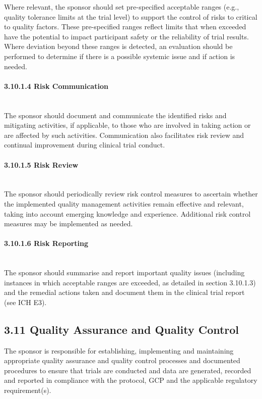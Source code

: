 \documentclass[11pt]{article}
\begin{document}
Where relevant, the sponsor should set pre-specified acceptable ranges (e.g., quality tolerance limits at the trial level) to support the control of risks to critical to quality factors. These pre-specified ranges reflect limits that when exceeded have the potential to impact participant safety or the reliability of trial results. Where deviation beyond these ranges is detected, an evaluation should be performed to determine if there is a possible systemic issue and if action is needed.


\paragraph{3.10.1.4 Risk Communication}\mbox{}\\

The sponsor should document and communicate the identified risks and mitigating activities, if applicable, to those who are involved in taking action or are affected by such activities. Communication also facilitates risk review and continual improvement during clinical trial conduct.


\paragraph{3.10.1.5 Risk Review}\mbox{}\\

The sponsor should periodically review risk control measures to ascertain whether the implemented quality management activities remain effective and relevant, taking into account emerging knowledge and experience. Additional risk control measures may be implemented as needed.


\paragraph{3.10.1.6 Risk Reporting}\mbox{}\\

The sponsor should summarise and report important quality issues (including instances in which acceptable ranges are exceeded, as detailed in section 3.10.1.3) and the remedial actions taken and document them in the clinical trial report (see ICH E3).


\subsection{3.11 Quality Assurance and Quality Control}

The sponsor is responsible for establishing, implementing and maintaining appropriate quality assurance and quality control processes and documented procedures to ensure that trials are conducted and data are generated, recorded and reported in compliance with the protocol, GCP and the applicable regulatory requirement(s).
\end{document}
